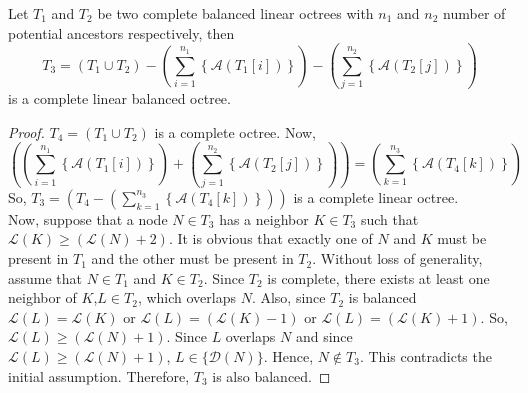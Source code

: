 \begin{lemma}
Let $T_1$ and $T_2$ be two complete balanced linear octrees with $n_{1}$ and $n_{2}$ number of potential ancestors respectively, then \[T_3 = \left(T_1 \cup T_2\right)- \left({\sum_{i=1}^{n_{1}}} \left\{\mathcal{A}(T_1[i])\right\} \right) - \left({\sum_{j=1}^{n_{2}}} \left\{\mathcal{A}(T_2[j])\right\}\right)\] is a complete linear balanced octree.
\label{lemma:merge}
\end{lemma}

\begin{proof}
$T_4 = \left(T_1 \cup T_2\right)$ is a complete octree. Now,
\[
\left(\left({\sum_{i=1}^{n_{1}}} \left\{\mathcal{A}(T_1[i])\right\} \right) + \left({\sum_{j=1}^{n_{2}}} \left\{\mathcal{A}(T_2[j])\right\}\right) \right) = \left({\sum_{k=1}^{n_{3}}} \left\{\mathcal{A}(T_4[k])\right\}\right)
\]
So, $T_3=\left(T_4 - \left({\displaystyle \sum_{k=1}^{n_{3}}} \left\{\mathcal{A}(T_4[k])\right\}\right)\right)$ is a complete linear octree.\\
Now, suppose that a node $N \in T_3$ has a neighbor $K \in T_3$ such that $\mathcal{L}(K) \geq \left(\mathcal{L}(N)+2\right)$. It is obvious that exactly one of $N$ and $K$ must be present in $T_1$ and the other must be present in $T_2$. Without loss of generality, assume that $N \in T_1$ and $K \in T_2$. Since $T_2$ is complete, there exists at least one neighbor of $K$,$L \in T_2$, which overlaps $N$. Also, since $T_2$ is balanced $\mathcal{L}(L) = \mathcal{L}(K)$ or $\mathcal{L}(L) = \left(\mathcal{L}(K)-1\right)$ or $\mathcal{L}(L) = \left(\mathcal{L}(K)+1\right)$. So, $\mathcal{L}(L) \geq \left(\mathcal{L}(N) +1\right)$. Since $L$ overlaps $N$ and since $\mathcal{L}(L) \geq \left(\mathcal{L}(N) +1\right)$, $L \in \{\mathcal{D}(N)\}$. Hence, $N \notin T_3$. This contradicts the initial assumption. Therefore, $T_3$ is also balanced.
\end{proof}


